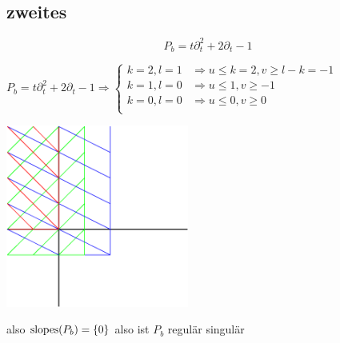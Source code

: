 \subsection{zweites}
\[
  P_b=t\partial_t^2+2\partial_t-1
\]

$
P_b=t\partial_t^2+2\partial_t-1 \Rightarrow 
\begin{cases}
  k=2,l=1 & \Rightarrow u\leq k=2, v\geq l-k=-1\\
  k=1,l=0 & \Rightarrow u\leq 1, v\geq -1\\
  k=0,l=0 & \Rightarrow u\leq 0, v\geq 0\\
\end{cases}
$

\begin{center}
  \includegraphics[width=6cm]{beispiele/img/b.png}
\end{center}
also $\operatorname{slopes}(P_b)=\{0\}$ also ist $P_b$ regulär singulär

